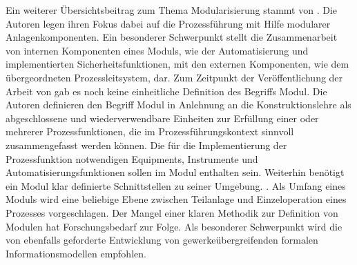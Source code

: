 Ein weiterer \"Ubersichtsbeitrag zum Thema Modularisierung stammt von \citeauthor{Urbas_2012} . Die Autoren legen ihren Fokus dabei auf die Prozessf\"uhrung mit Hilfe modularer Anlagenkomponenten. Ein besonderer Schwerpunkt stellt die Zusammenarbeit von internen Komponenten eines Moduls, wie der Automatisierung und implementierten Sicherheitsfunktionen, mit den externen Komponenten, wie dem \"ubergeordneten Prozessleitsystem, dar. \newline
Zum Zeitpunkt der Ver\"offentlichung der Arbeit  von \citeauthor{Urbas_2012} gab es noch keine einheitliche Definition des Begriffs \glqq Modul\grqq { }. Die Autoren definieren den Begriff Modul in Anlehnung an die Konstruktionslehre als \glqq abgeschlossene und wiederverwendbare Einheiten zur Erf\"ullung einer oder mehrerer Prozessfunktionen, die im Prozessf\"uhrungskontext sinnvoll zusammengefasst werden k\"onnen.\grqq { }\cite[S. 2]{Urbas_2012} Die für die Implementierung der Prozessfunktion notwendigen Equipments, Instrumente und Automatisierungsfunktionen sollen im Modul enthalten sein. Weiterhin ben\"otigt ein Modul klar definierte Schnittstellen zu seiner Umgebung. \cite[S. 2]{Urbas_2012}. Als Umfang eines Moduls wird eine beliebige Ebene zwischen Teilanlage und Einzeloperation eines Prozesses vorgeschlagen. Der Mangel einer klaren Methodik zur Definition von Modulen hat Forschungsbedarf zur Folge. Als besonderer Schwerpunkt wird die von \citeauthor{Bramsiepe_2012} ebenfalls geforderte Entwicklung von gewerke\"ubergreifenden formalen Informationsmodellen empfohlen. \cite{Urbas_2012}

